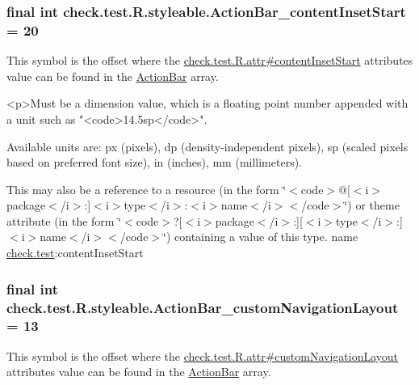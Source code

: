 \subsubsection[{Action\+Bar\+\_\+content\+Inset\+Start}]{\setlength{\rightskip}{0pt plus 5cm}final int check.\+test.\+R.\+styleable.\+Action\+Bar\+\_\+content\+Inset\+Start = 20\hspace{0.3cm}{\ttfamily [static]}}\label{classcheck_1_1test_1_1_r_1_1styleable_a4c5e7ea9ebcd8ec777039551daa8f3f5}
This symbol is the offset where the \hyperlink{classcheck_1_1test_1_1_r_1_1attr_aff1a02632be3b62d04d2aff4c7f17b43}{check.\+test.\+R.\+attr\#content\+Inset\+Start} attribute\textquotesingle{}s value can be found in the \hyperlink{classcheck_1_1test_1_1_r_1_1styleable_ad0a4d403cb244ea4d22c6f6ebf2c2cdf}{Action\+Bar} array.

\begin{DoxyVerb}      <p>Must be a dimension value, which is a floating point number appended with a unit such as "<code>14.5sp</code>".
\end{DoxyVerb}
 Available units are\+: px (pixels), dp (density-\/independent pixels), sp (scaled pixels based on preferred font size), in (inches), mm (millimeters). 

This may also be a reference to a resource (in the form \char`\"{}$<$code$>$@\mbox{[}$<$i$>$package$<$/i$>$\+:\mbox{]}$<$i$>$type$<$/i$>$\+:$<$i$>$name$<$/i$>$$<$/code$>$\char`\"{}) or theme attribute (in the form \char`\"{}$<$code$>$?\mbox{[}$<$i$>$package$<$/i$>$\+:\mbox{]}\mbox{[}$<$i$>$type$<$/i$>$\+:\mbox{]}$<$i$>$name$<$/i$>$$<$/code$>$\char`\"{}) containing a value of this type.  name \hyperlink{namespacecheck_1_1test}{check.\+test}\+:content\+Inset\+Start \hypertarget{classcheck_1_1test_1_1_r_1_1styleable_ae4307a4bd959bb1787eb44b851f56578}{}
\subsubsection[{Action\+Bar\+\_\+custom\+Navigation\+Layout}]{\setlength{\rightskip}{0pt plus 5cm}final int check.\+test.\+R.\+styleable.\+Action\+Bar\+\_\+custom\+Navigation\+Layout = 13\hspace{0.3cm}{\ttfamily [static]}}\label{classcheck_1_1test_1_1_r_1_1styleable_ae4307a4bd959bb1787eb44b851f56578}
This symbol is the offset where the \hyperlink{classcheck_1_1test_1_1_r_1_1attr_a6132e124e79744e029a15cfffe9bc575}{check.\+test.\+R.\+attr\#custom\+Navigation\+Layout} attribute\textquotesingle{}s value can be found in the \hyperlink{classcheck_1_1test_1_1_r_1_1styleable_ad0a4d403cb244ea4d22c6f6ebf2c2cdf}{Action\+Bar} array.


